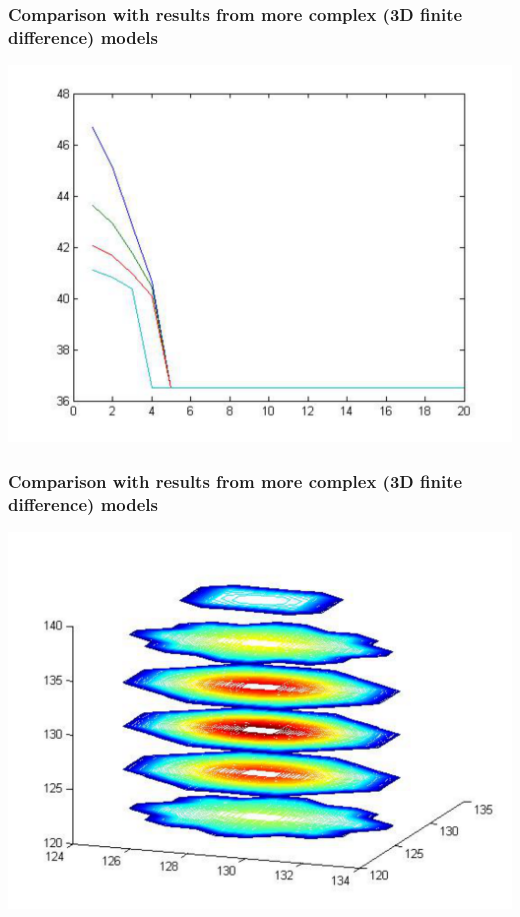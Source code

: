 \documentclass{beamer}
\begin{document}
\begin{frame}
\frametitle{Comparison with results from more complex (3D finite difference) models}
\begin{center}
\includegraphics[scale=0.4]{Pages/jmurleytempfalling.pdf}
\end{center}
\end{frame}
\begin{frame}
\frametitle{Comparison with results from more complex (3D finite difference) models}
\begin{center}
\includegraphics[scale=0.4]{Pages/jmurleycontourslices.pdf}
\end{center}
\end{frame}
\end{document}
